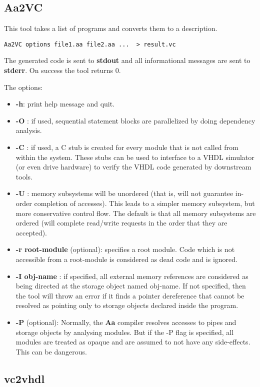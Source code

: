 \subsection{{\bf Aa2VC}}

This tool takes a list of \Aa programs and converts them
to a \vC description. 
\begin{verbatim}
Aa2VC options file1.aa file2.aa ...  > result.vc
\end{verbatim}
The generated \vC code is sent to {\bf stdout} and all informational
messages are sent to {\bf stderr}.  On success the tool returns 0.

The options:
\begin{itemize}
\item {\bf -h}: print help message and quit.
\item {\bf -O} : if used, sequential statement blocks are parallelized
by doing dependency analysis.
\item {\bf -C} : if used, a C stub is created for every module that
is not called from within the system.  These stubs can be used to
interface to a VHDL simulator (or even drive hardware) to verify
the VHDL code generated by downstream tools.
\item {\bf -U} : memory subsystems will be unordered (that is,
will not guarantee in-order completion of accesses).  This
leads to a simpler memory subsystem, but more conservative
control flow.  The default is that all memory subsystems
are ordered (will complete read/write requests in the order that
they are accepted).
\item {\bf -r root-module} (optional): specifies a root module.
Code which is not accessible from a root-module is considered
as dead code and is ignored.
\item {\bf -I obj-name} : if specified, all external memory references
are considered as being directed at the storage object named obj-name.
If not specified, then the tool will throw an error if it finds
a pointer dereference that cannot be resolved as pointing only to
storage objects declared inside the \Aa program.
\item {\bf -P} (optional):  Normally, the {\bf Aa} compiler resolves
accesses to pipes and storage objects by analysing modules.  But if
the -P flag is specified, all modules are treated as opaque and
are assumed to not have any side-effects.  This can be dangerous.
\end{itemize}

\subsection{\bf vc2vhdl}

